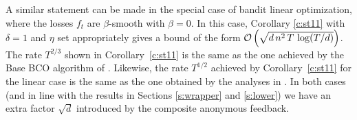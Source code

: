 %
\begin{remark}
A similar statement can be made in the special case of bandit linear optimization, where the losses $f_t$ are $\beta$-smooth with $\beta =0$. In this case, Corollary \ref{c:st11} with $\delta = 1$ and $\eta$ set appropriately gives a bound of the form $\mathcal{O}\left(\sqrt{d\,n^2\,T\,\log(T/d)}\right)$. The rate $T^{2/3}$ shown in Corollary~\ref{c:st11} is the same as the one achieved by the Base BCO algorithm of \citet{st11}. Likewise, the rate $T^{1/2}$ achieved by Corollary~\ref{c:st11} for the linear case is the same as the one obtained by the analyses in \citep{ahr12,st11}. In both cases (and in line with the results in Sections \ref{s:wrapper} and \ref{s:lower}) we have an extra factor $\sqrt{d}$ introduced by the composite anonymous feedback.
\end{remark}
